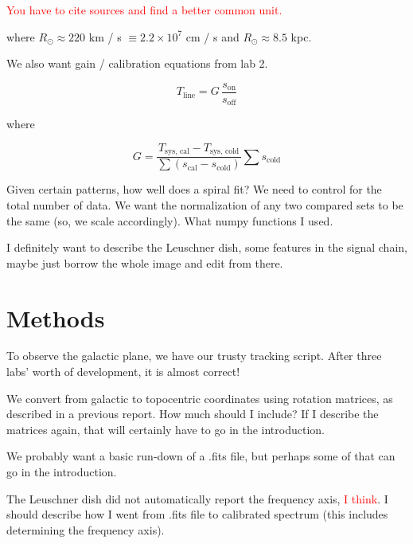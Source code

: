 \documentclass[12pt]{article}
\begin{document}
\textcolor{red}{You have to cite sources and find a better common unit.}

where $R_\odot \approx 220 $ km / s $\equiv 2.2 \times 10^7$ cm / s and $R_\odot \approx 8.5$ kpc. 

We also want gain / calibration equations from lab 2.

\begin{equation} \label{eq:line_shape}
T_\text{line} = G \, \frac{s_\text{on}}{s_\text{off}}
\end{equation}

where

\begin{equation} \label{eq:line_gain}
G = \frac{T_\text{sys, cal} - T_\text{sys, cold}}{\sum{(s_\text{cal} - s_\text{cold})}} \sum{s_\text{cold}}
\end{equation}

Given certain patterns, how well does a spiral fit? We need to control for the total number of data. We want the normalization of any two compared sets to be the same (so, we scale accordingly). What numpy functions I used.

I definitely want to describe the Leuschner dish, some features in the signal chain, maybe just borrow the whole image and edit from there.

\section{Methods}

\quad \quad To observe the galactic plane, we have our trusty tracking script. After three labs' worth of development, it is almost correct!

We convert from galactic to topocentric coordinates using rotation matrices, as described in a previous report. How much should I include? If I describe the matrices again, that will certainly have to go in the introduction.

We probably want a basic run-down of a .fits file, but perhaps some of that can go in the introduction.

The Leuschner dish did not automatically report the frequency axis, \textcolor{red}{I think}. I should describe how I went from .fits file to calibrated spectrum (this includes determining the frequency axis).

\end{document}
